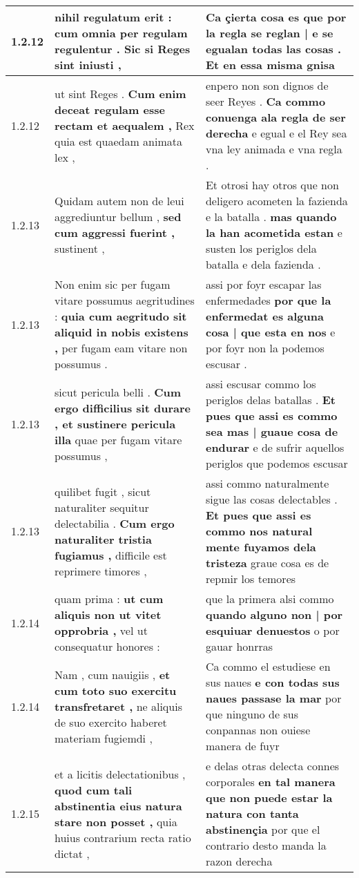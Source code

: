 \begin{tabular}{|p{1cm}|p{6.5cm}|p{6.5cm}|}
1.2.12 & nihil regulatum erit : \textbf{ cum omnia per regulam regulentur . } Sic si Reges sint iniusti , & Ca çierta cosa es \textbf{ que por la regla se reglan | e se egualan todas las cosas . } Et en essa misma gnisa \\\hline
1.2.12 & ut sint Reges . \textbf{ Cum enim deceat regulam esse rectam et aequalem , } Rex quia est quaedam animata lex , & enpero non son dignos de seer Reyes . \textbf{ Ca commo conuenga ala regla de ser derecha } e egual e el Rey sea vna ley animada e vna regla . \\\hline
1.2.13 & Quidam autem non de leui aggrediuntur bellum , \textbf{ sed cum aggressi fuerint , } sustinent , & Et otrosi hay otros que non deligero acometen la fazienda e la batalla . \textbf{ mas quando la han acometida estan } e susten los periglos dela batalla e dela fazienda . \\\hline
1.2.13 & Non enim sic per fugam vitare possumus aegritudines : \textbf{ quia cum aegritudo sit aliquid in nobis existens , } per fugam eam vitare non possumus . & assi por foyr escapar las enfermedades \textbf{ por que la enfermedat es alguna cosa | que esta en nos } e por foyr non la podemos escusar . \\\hline
1.2.13 & sicut pericula belli . \textbf{ Cum ergo difficilius sit durare , et sustinere pericula illa } quae per fugam vitare possumus , & assi escusar commo los periglos delas batallas . \textbf{ Et pues que assi es commo sea mas | guaue cosa de endurar } e de sufrir aquellos periglos que podemos escusar \\\hline
1.2.13 & quilibet fugit , sicut naturaliter sequitur delectabilia . \textbf{ Cum ergo naturaliter tristia fugiamus , } difficile est reprimere timores , & assi commo naturalmente sigue las cosas delectables . \textbf{ Et pues que assi es commo nos natural mente fuyamos dela tristeza } graue cosa es de repmir los temores \\\hline
1.2.14 & quam prima : \textbf{ ut cum aliquis non ut vitet opprobria , } vel ut consequatur honores : & que la primera alsi commo \textbf{ quando alguno non | por esquiuar denuestos } o por gauar honrras \\\hline
1.2.14 & Nam , cum nauigiis , \textbf{ et cum toto suo exercitu transfretaret , } ne aliquis de suo exercito haberet materiam fugiemdi , & Ca commo el estudiese en sus naues \textbf{ e con todas sus naues passase la mar } por que ninguno de sus conpannas non ouiese manera de fuyr \\\hline
1.2.15 & et a licitis delectationibus , \textbf{ quod cum tali abstinentia eius natura stare non posset , } quia huius contrarium recta ratio dictat , & e delas otras delecta connes corporales \textbf{ en tal manera que non puede estar la natura con tanta abstinençia } por que el contrario desto manda la razon derecha \\\hline

\end{tabular}
